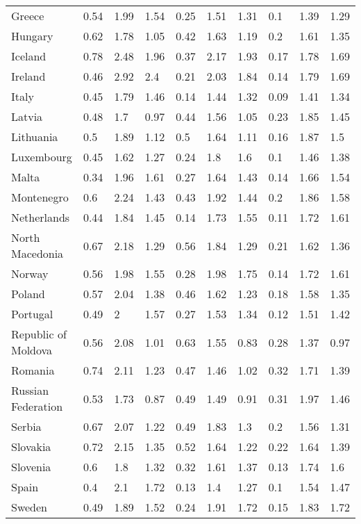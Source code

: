 \begin{longtable}[t]{llllllllll}
Greece & 0.54 & 1.99 & 1.54 & 0.25 & 1.51 & 1.31 & 0.1 & 1.39 & 1.29\\
Hungary & 0.62 & 1.78 & 1.05 & 0.42 & 1.63 & 1.19 & 0.2 & 1.61 & 1.35\\
Iceland & 0.78 & 2.48 & 1.96 & 0.37 & 2.17 & 1.93 & 0.17 & 1.78 & 1.69\\
Ireland & 0.46 & 2.92 & 2.4 & 0.21 & 2.03 & 1.84 & 0.14 & 1.79 & 1.69\\
Italy & 0.45 & 1.79 & 1.46 & 0.14 & 1.44 & 1.32 & 0.09 & 1.41 & 1.34\\
Latvia & 0.48 & 1.7 & 0.97 & 0.44 & 1.56 & 1.05 & 0.23 & 1.85 & 1.45\\
Lithuania & 0.5 & 1.89 & 1.12 & 0.5 & 1.64 & 1.11 & 0.16 & 1.87 & 1.5\\
Luxembourg & 0.45 & 1.62 & 1.27 & 0.24 & 1.8 & 1.6 & 0.1 & 1.46 & 1.38\\
Malta & 0.34 & 1.96 & 1.61 & 0.27 & 1.64 & 1.43 & 0.14 & 1.66 & 1.54\\
Montenegro & 0.6 & 2.24 & 1.43 & 0.43 & 1.92 & 1.44 & 0.2 & 1.86 & 1.58\\
Netherlands & 0.44 & 1.84 & 1.45 & 0.14 & 1.73 & 1.55 & 0.11 & 1.72 & 1.61\\
North Macedonia & 0.67 & 2.18 & 1.29 & 0.56 & 1.84 & 1.29 & 0.21 & 1.62 & 1.36\\
Norway & 0.56 & 1.98 & 1.55 & 0.28 & 1.98 & 1.75 & 0.14 & 1.72 & 1.61\\
Poland & 0.57 & 2.04 & 1.38 & 0.46 & 1.62 & 1.23 & 0.18 & 1.58 & 1.35\\
Portugal & 0.49 & 2 & 1.57 & 0.27 & 1.53 & 1.34 & 0.12 & 1.51 & 1.42\\
Republic of Moldova & 0.56 & 2.08 & 1.01 & 0.63 & 1.55 & 0.83 & 0.28 & 1.37 & 0.97\\
Romania & 0.74 & 2.11 & 1.23 & 0.47 & 1.46 & 1.02 & 0.32 & 1.71 & 1.39\\
Russian Federation & 0.53 & 1.73 & 0.87 & 0.49 & 1.49 & 0.91 & 0.31 & 1.97 & 1.46\\
Serbia & 0.67 & 2.07 & 1.22 & 0.49 & 1.83 & 1.3 & 0.2 & 1.56 & 1.31\\
Slovakia & 0.72 & 2.15 & 1.35 & 0.52 & 1.64 & 1.22 & 0.22 & 1.64 & 1.39\\
Slovenia & 0.6 & 1.8 & 1.32 & 0.32 & 1.61 & 1.37 & 0.13 & 1.74 & 1.6\\
Spain & 0.4 & 2.1 & 1.72 & 0.13 & 1.4 & 1.27 & 0.1 & 1.54 & 1.47\\
Sweden & 0.49 & 1.89 & 1.52 & 0.24 & 1.91 & 1.72 & 0.15 & 1.83 & 1.72\\

\end{longtable}
